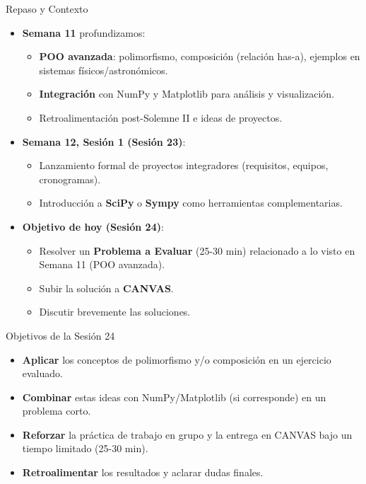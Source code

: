 \documentclass[10pt]{beamer}
\begin{document}
\begin{frame}{Repaso y Contexto}
  \begin{itemize}
    \item \textbf{Semana 11} profundizamos:
      \begin{itemize}
        \item \textbf{POO avanzada}: polimorfismo, composición (relación has-a), ejemplos en sistemas físicos/astronómicos.
        \item \textbf{Integración} con NumPy y Matplotlib para análisis y visualización.
        \item Retroalimentación post-Solemne II e ideas de proyectos.
      \end{itemize}
    \item \textbf{Semana 12, Sesión 1 (Sesión 23)}:
      \begin{itemize}
        \item Lanzamiento formal de proyectos integradores (requisitos, equipos, cronogramas).
        \item Introducción a \textbf{SciPy} o \textbf{Sympy} como herramientas complementarias.
      \end{itemize}
    \item \textbf{Objetivo de hoy (Sesión 24)}:
      \begin{itemize}
        \item Resolver un \textbf{Problema a Evaluar} (25-30 min) relacionado a lo visto en Semana 11 (POO avanzada).
        \item Subir la solución a \textbf{CANVAS}.
        \item Discutir brevemente las soluciones.
      \end{itemize}
  \end{itemize}
\end{frame}

\begin{frame}{Objetivos de la Sesión 24}
  \begin{itemize}
    \item \textbf{Aplicar} los conceptos de polimorfismo y/o composición en un ejercicio evaluado.
    \item \textbf{Combinar} estas ideas con NumPy/Matplotlib (si corresponde) en un problema corto.
    \item \textbf{Reforzar} la práctica de trabajo en grupo y la entrega en CANVAS bajo un tiempo limitado (25-30 min).
    \item \textbf{Retroalimentar} los resultados y aclarar dudas finales.
  \end{itemize}
\end{frame}
\end{document}
